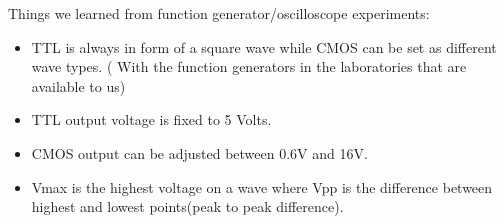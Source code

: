 \documentclass[pdftex,12pt,a4paper]{article}
\begin{document}
\begin{flushleft}
\newline Things we learned from function generator/oscilloscope experiments:
\begin{itemize}
    \item TTL is always in form of a square wave while CMOS can be set as different wave types. ( With the function generators in the laboratories that are available to us)
    \item TTL output voltage is fixed to 5 Volts.
    \item CMOS output can be adjusted between 0.6V and 16V.
    \item Vmax is the highest voltage on a wave where Vpp is the difference between highest and lowest points(peak to peak difference).
\end{itemize}
\end{flushleft}
\newpage

\nocite{overleaf}
\nocite{reportGuide}



\end{document}
